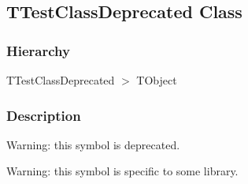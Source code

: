 \documentclass{report}
\begin{document}
\subsection*{TTestClassDeprecated Class}
\fi
\label{ok_hint_directives.TTestClassDeprecated}
\subsubsection*{\large{\textbf{Hierarchy}}\normalsize\hspace{1ex}\hfill}
TTestClassDeprecated {$>$} TObject
\subsubsection*{\large{\textbf{Description}}\normalsize\hspace{1ex}\hfill}
Warning: this symbol is deprecated.

Warning: this symbol is specific to some library.
\end{document}
